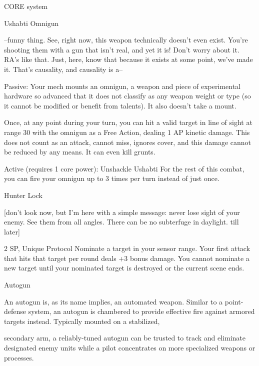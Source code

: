                                                    CORE system 

                                                 Ushabti Omnigun  

   --funny thing. See, right now, this weapon technically doesn’t even exist. You’re shooting them with a  
  gun that isn’t real, and yet it is! Don’t worry about it.  RA’s like that. Just, here, know that because it  
  exists at some point, we’ve made it. That’s causality, and causality is a--  

  Passive: Your mech mounts an omnigun, a weapon and piece of experimental hardware so advanced  
  that it does not classify as any weapon weight or type (so it cannot be modified or benefit from talents).  
  It also doesn’t take a mount.
 
  Once, at any point during your turn, you can hit a valid target in line of sight at range 30 with the  
  omnigun as a Free Action, dealing 1 AP kinetic damage. This does not count as an attack, cannot miss,  
  ignores cover, and this damage cannot be reduced by any means. It can even kill grunts.
 
  Active (requires 1 core power): Unshackle Ushabti  
  For the rest of this combat, you can fire your omnigun up to 3 times per turn instead of just once. 

Hunter Lock  

[don’t look now, but I’m here with a simple message: never lose sight of your enemy. See them from all  
angles. There can be no subterfuge in daylight. till later]
 

2 SP, Unique  
Protocol  
Nominate a target in your sensor range. Your first attack that hits that target per round deals +3  
bonus damage. You cannot nominate a new target until your nominated target is destroyed or  
the current scene ends.
 

                                                                                                                  


Autogun  

An autogun is, as its name implies, an automated weapon. Similar to a point-defense system, an autogun is  
chambered to provide effective fire against armored targets instead. Typically mounted on a stabilized,  

secondary arm, a reliably-tuned autogun can be trusted to track and eliminate designated enemy units  
while a pilot concentrates on more specialized weapons or processes.   

